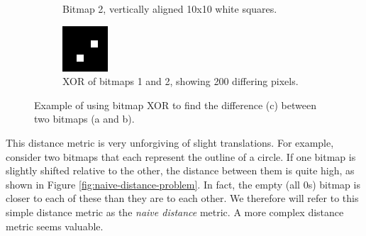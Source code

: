 \documentclass[12pt]{article}
\begin{document}
\begin{figure}[ht]
\begin{subfigure}[b]{.3\linewidth}
\caption{Bitmap 2, vertically aligned 10x10 white squares.}
\label{fig:squares-vertical}
\end{subfigure}
\hspace{2mm}
\begin{subfigure}[b]{.3\linewidth}
\includegraphics[width=\linewidth]{squares-diagonal.png}
\caption{XOR of bitmaps 1 and 2, showing 200 differing pixels.}
\label{fig:squares-diagonal}
\end{subfigure}
\caption{Example of using bitmap XOR to find the difference (c) between two bitmaps (a and b).}
\label{fig:naive-distance}
\end{figure}

This distance metric is very unforgiving of slight translations.  For example, consider two bitmaps that each represent the outline of a circle.  If one bitmap is slightly shifted relative to the other, the distance between them is quite high, as shown in Figure \ref{fig:naive-distance-problem}.  In fact, the empty (all 0s) bitmap is closer to each of these than they are to each other.  We therefore will refer to this simple distance metric as the \textit{naive distance} metric. A more complex distance metric seems valuable.
\end{document}
